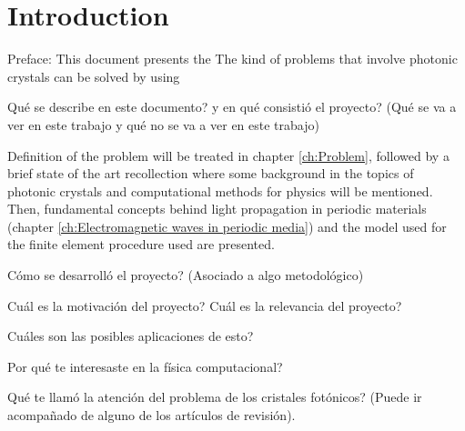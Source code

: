 \cleardoublepage {}
{}
\chapter*{Introduction}

Preface:
This document presents the 
The kind of problems that involve photonic crystals can be solved by using 


Qu\'e se describe en este documento? y en qu\'e consisti\'o el proyecto? (Qu\'e se va a ver en este trabajo y qu\'e no se va a ver en este trabajo)


Definition of the problem will be treated in chapter \ref{ch:Problem}, followed by a brief state of the art recollection where some background in the topics of photonic crystals and computational methods for physics will be mentioned. Then, fundamental concepts behind light propagation in periodic materials (chapter \ref{ch:Electromagnetic waves in periodic media})  and the model used for the finite element procedure used are presented.

C\'omo se desarroll\'o el proyecto? (Asociado a algo metodol\'ogico)

Cu\'al es la motivaci\'on del proyecto? Cu\'al es la relevancia del proyecto?

Cu\'ales son las posibles aplicaciones de esto?

Por qu\'e te interesaste en la f\'isica computacional?

Qu\'e te llam\'o la atenci\'on del problema de los cristales fot\'onicos? (Puede ir acompa\~nado de alguno de los art\'iculos de revisi\'on).


